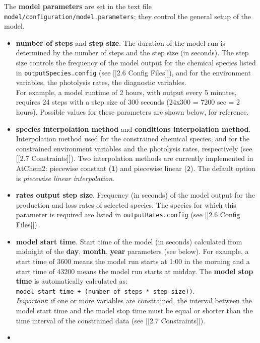 The \textbf{model parameters} are set in the text file
\texttt{model/configuration/model.parameters}; they control the general
setup of the model.

\begin{itemize}
\item
  \textbf{number of steps} and \textbf{step size}. The duration of the
  model run is determined by the number of steps and the step size (in
  seconds). The step size controls the frequency of the model output for
  the chemical species listed in \texttt{outputSpecies.config} (see
  {[}{[}2.6 Config Files{]}{]}), and for the environment variables, the
  photolysis rates, the diagnostic variables.\\
  For example, a model runtime of 2 hours, with output every 5 minutes,
  requires 24 steps with a step size of 300 seconds (24x300 = 7200 sec =
  2 hours). Possible values for these parameters are shown below, for
  reference.
\item
  \textbf{species interpolation method} and \textbf{conditions
  interpolation method}. Interpolation method used for the constrained
  chemical species, and for the constrained environment variables and
  the photolysis rates, respectively (see {[}{[}2.7 Constraints{]}{]}).
  Two interpolation methods are currently implemented in AtChem2:
  piecewise constant (\texttt{1}) and piecewise linear (\texttt{2}). The
  default option is \emph{piecewise linear interpolation}.
\item
  \textbf{rates output step size}. Frequency (in seconds) of the model
  output for the production and loss rates of selected species. The
  species for which this parameter is required are listed in
  \texttt{outputRates.config} (see {[}{[}2.6 Config Files{]}{]}).
\item
  \textbf{model start time}. Start time of the model (in seconds)
  calculated from midnight of the \textbf{day}, \textbf{month},
  \textbf{year} parameters (see below). For example, a start time of
  3600 means the model run starts at 1:00 in the morning and a start
  time of 43200 means the model run starts at midday. The \textbf{model
  stop time} is automatically calculated as:
  \texttt{model\ start\ time\ +\ (number\ of\ steps\ *\ step\ size))}.\\
  \emph{Important}: if one or more variables are constrained, the
  interval between the model start time and the model stop time must be
  equal or shorter than the time interval of the constrained data (see
  {[}{[}2.7 Constraints{]}{]}).
\item

\end{itemize}
